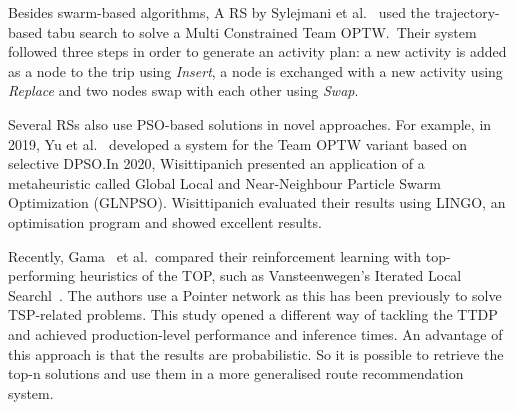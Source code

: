 Besides swarm-based algorithms, A RS by Sylejmani et al.~\cite{Sylejmani2012}
used the trajectory-based tabu search to solve a Multi Constrained Team OPTW.\
Their system followed three steps in order to generate an activity plan: a new
activity is added as a node to the trip using \emph{Insert}, a node is
exchanged with a new activity using \emph{Replace} and two nodes swap with each
other using \emph{Swap}. 

Several RSs also use PSO-based solutions in novel approaches. For example, in
2019, Yu et al.~\cite{Yu2019} developed a system for the Team OPTW variant based on
selective DPSO.\@ In 2020, Wisittipanich\cite{Wisittipanich2020} presented an application of a
metaheuristic called Global Local and Near-Neighbour Particle Swarm
Optimization (GLNPSO). Wisittipanich evaluated their results using LINGO, an
optimisation program and showed excellent results.

Recently, Gama~\cite{Gama2020}  et al.\ compared their reinforcement learning with
top-performing heuristics of the TOP, such as Vansteenwegen's Iterated Local
Searchl~\cite{Vansteenwegen2009}. The authors use a Pointer network as this has been
previously to solve TSP-related problems. This study opened a different way of
tackling the TTDP and achieved production-level performance and inference
times. An advantage of this approach is that the results are probabilistic. So
it is possible to retrieve the top-n solutions and use them in a more
generalised route recommendation system.

